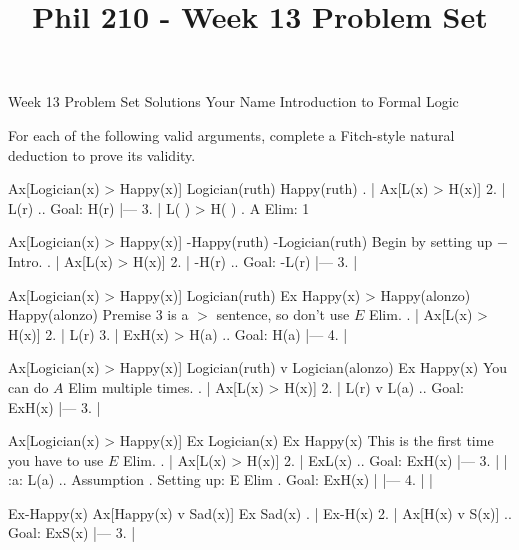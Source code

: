 
\title{Phil 210 - Week 13 Problem Set}

\heading
Week 13 Problem Set Solutions
Your Name
Introduction to Formal Logic
\endheading

For each of the following valid arguments, complete a Fitch-style natural deduction to prove its validity.

\quantifiers
\problems
{}
\argument
 Ax[Logician(x) > Happy(x)]
 Logician(ruth) 
\argumentline
 Happy(ruth) 
\endargument
	\answer
	. | Ax[L(x) > H(x)]
	 2. | L(r)             ..  Goal: H(r)
	    |---
	 3. | L( ) > H( )      .  A Elim: 1
	\endfitchproof
	\endanswer

\argument
 Ax[Logician(x) > Happy(x)]
 -Happy(ruth) 
\argumentline
 -Logician(ruth) 
\endargument
\Hint Begin by setting up $-$ Intro.
	\answer
	. | Ax[L(x) > H(x)]
	 2. | -H(r)             ..  Goal: -L(r)
	    |---
	 3. | 
	\endfitchproof
	\endanswer

\argument
 Ax[Logician(x) > Happy(x)]
 Logician(ruth)
 Ex Happy(x) > Happy(alonzo)
\argumentline
 Happy(alonzo) 
\endargument
\Hint Premise 3 is a $>$ sentence, so don't use $E$ Elim.
	\answer
	. | Ax[L(x) > H(x)]
	 2. | L(r)
	 3. | ExH(x) > H(a)    ..  Goal: H(a)
	    |---
	 4. |
	\endfitchproof
	\endanswer

\argument
 Ax[Logician(x) > Happy(x)]
 Logician(ruth) v Logician(alonzo)
\argumentline
 Ex Happy(x)
\endargument
\Hint You can do $A$ Elim multiple times.
	\answer
	. | Ax[L(x) > H(x)]
	 2. | L(r) v L(a)      ..  Goal: ExH(x)
	    |---
	 3. | 
	\endfitchproof
	\endanswer

\argument
 Ax[Logician(x) > Happy(x)]
 Ex Logician(x)
\argumentline
 Ex Happy(x)
\endargument
\Hint This is the first time you have to use $E$ Elim.
	\answer
	. | Ax[L(x) > H(x)]
	 2. | ExL(x)           ..  Goal: ExH(x)
	    |---
	 3. |   | :a: L(a)     ..  Assumption  .  Setting up: E Elim  .  Goal: ExH(x)
	    |   |---
	 4. |   |
	\endfitchproof
	\endanswer

\argument
 Ex-Happy(x)
 Ax[Happy(x) v Sad(x)]
\argumentline
 Ex Sad(x)
\endargument
	\answer
	. | Ex-H(x)
	 2. | Ax[H(x) v S(x)]  ..  Goal: ExS(x)
	    |---
	 3. | 
	\endfitchproof
	\endanswer

\endproblems
\bye
